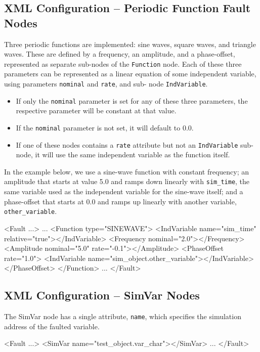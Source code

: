 \documentclass[11pt,fleqn]{report}
\begin{document}
\subsection{XML Configuration -- Periodic Function Fault Nodes}
Three periodic functions are implemented: sine waves, square waves, and
triangle waves.
These are defined by a frequency, an amplitude, and a phase-offset, represented
as separate sub-nodes of the \verb'Function' node.
Each of these three parameters can be represented as a linear equation of some
independent variable, using parameters \verb"nominal" and \verb'rate', and sub-
node \verb'IndVariable'.
\begin{itemize}
 \item If only the \verb"nominal" parameter is set for any of these three
 parameters, the respective parameter will be constant at that value.
 \item If the \verb"nominal" parameter is not set, it will default to 0.0.
 \item If one of these nodes contains a \verb"rate" attribute but not an
 \verb"IndVariable" sub-node, it will use the same independent variable as the
 function itself.
\end{itemize}

In the example below, we use a sine-wave function with constant frequency; an
amplitude that starts at value 5.0 and ramps down linearly with \verb"sim_time",
the same variable used as the independent variable for the sine-wave itself;
and a phase-offset that starts at 0.0 and ramps up linearly with another
variable, \verb"other_variable".

\begin{codeXML}
<Fault ...>
  ...
  <Function type="SINEWAVE">
    <IndVariable name="sim_time" relative="true"></IndVariable>
    <Frequency nominal="2.0"></Frequency>
    <Amplitude nominal="5.0" rate="-0.1"></Amplitude>
    <PhaseOffset rate="1.0">
      <IndVariable name="sim_object.other_variable"></IndVariable>
    </PhaseOffset>
  </Function>
  ...
</Fault>
\end{codeXML}

\subsection {XML Configuration -- SimVar Nodes}
The SimVar node has a single attribute, \verb'name', which specifies the
simulation address of the faulted variable.
\begin{codeXML}
<Fault ...>
  <SimVar name="test_object.var_char"></SimVar>
  ...
</Fault>
\end{codeXML}
\end{document}
